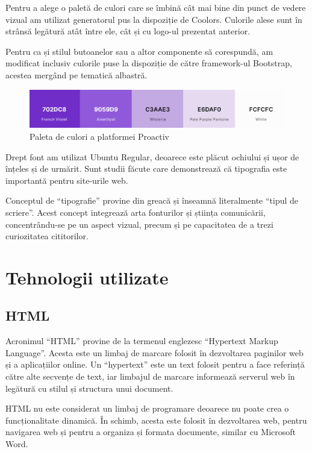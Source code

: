 \documentclass[12pt,a4paper]{report}
\begin{document}
\par
Pentru a alege o paletă de culori care se îmbină cât mai bine din punct de vedere vizual am utilizat generatorul pus la dispoziție de Coolors\cite{coolors}. Culorile alese sunt în strânsă legătură atât între ele, cât și cu logo-ul prezentat anterior.
\\\par 
Pentru ca și stilul butoanelor sau a altor componente să corespundă, am modificat inclusiv culorile puse la dispoziție de către framework-ul Bootstrap, acestea mergând pe tematică albastră.
\\
\begin{figure}[H]
\centering
  \includegraphics[width=1\linewidth]{./imagini/coolors.PNG}
  \caption{Paleta de culori a platformei Proactiv}
\end{figure}

\par
Drept font am utilizat Ubuntu Regular, deoarece este plăcut ochiului și ușor de înțeles și de urmărit. Sunt studii făcute care demonstrează că tipografia este importantă pentru site-urile web. 
\\\par 
Conceptul de “tipografie” provine din greacă și înseamnă literalmente “tipul de scriere”. Acest concept integrează arta fonturilor și știința comunicării, concentrându-se pe un aspect vizual, precum și pe capacitatea de a trezi curiozitatea cititorilor.

\newpage
\section{Tehnologii utilizate}
\subsection{HTML}
\par
Acronimul “HTML” provine de la termenul englezesc “Hypertext Markup Language”. Acesta este un limbaj de marcare folosit în dezvoltarea paginilor web și a aplicațiilor online. Un “hypertext” este un text folosit pentru a face referință către alte secvențe de text, iar limbajul de marcare informează serverul web în legătură cu stilul și structura unui document.
\\\par 
HTML nu este considerat un limbaj de programare deoarece nu poate crea o funcționalitate dinamică. În schimb, acesta este folosit în dezvoltarea web, pentru navigarea web și pentru a organiza și formata documente, similar cu Microsoft Word.
\end{document}
